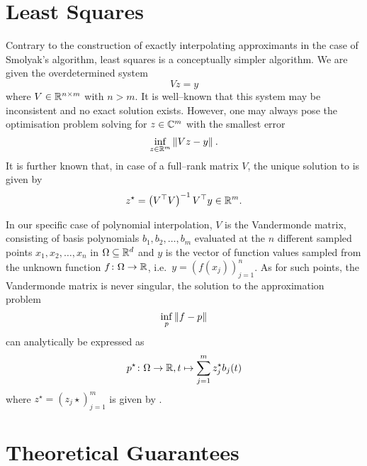 \documentclass[12pt, oneside]{amsart}
\theoremstyle{definition}
\theoremstyle{remark}
\numberwithin{equation}{section}
\begin{document}
\section{Least Squares}


Contrary to the construction of exactly interpolating approximants in the case of Smolyak's algorithm, least squares is a conceptually simpler algorithm. We are given the overdetermined system \[
    Vz = y
\]
where \(V \in \R^{n \times m}\) with \(n > m\). It is well--known that this system may be inconsistent and no exact solution exists. However, one may always pose the optimisation problem solving for \(z \in \C^{m}\) with the smallest error
\begin{equation}\label{eq:leastSquares}
    \inf_{z \in \R^{m}} \norm[]{Vz - y}.
\end{equation}
It is further known that, in case of a full--rank matrix \(V\), the unique 
solution to  is given by 
\begin{equation}\label{eq:ls_solution_moore_penrose_inverse}
	z^\star = \left(V^\top V\right)^{-1} V^\top y \in \R^m.
\end{equation}
    
In our specific case of polynomial interpolation, \(V\) is the Vandermonde 
matrix, consisting of basis polynomials \(b_1, b_2, \dots, b_m\) evaluated at 
the $n$ different sampled points \(x_1, x_2, \dots, x_n\) in \(\Omega \subseteq 
\R^d\) and \(y\) is the vector of function values sampled from the unknown 
function \(f\from \Omega \to \R\), i.e.\ \(y = \left(f(x_j)\right)_{j=1}^n\). 
As for such points, the Vandermonde matrix is never singular, the solution to 
the approximation problem \[
    \inf_{p} \norm[]{f-p}
\]
can analytically be expressed as \[
    p^\star\from \Omega \to \R, t \mapsto \sum_{j=1}^m z_j^\star b_j(t)
\]
where \(z^\star = \left(z_j\star\right)_{j=1}^m\) is given by 
.

\section{Theoretical Guarantees}
\end{document}
